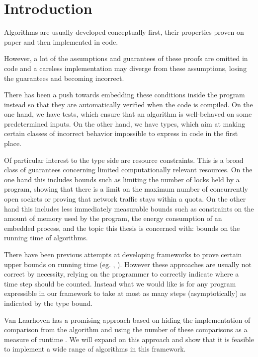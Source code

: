 
\chapter{Introduction}
Algorithms are usually developed conceptually first, their properties proven on paper and then implemented in code.

However, a lot of the assumptions and guarantees of these proofs are omitted in code and a careless implementation may diverge from these assumptions, losing the guarantees and becoming incorrect.

There has been a push towards embedding these conditions inside the program instead so that they are automatically verified when the code is compiled. On the one hand, we have tests, which ensure that an algorithm is well-behaved on some predetermined inputs. On the other hand, we have types, which aim at making certain classes of incorrect behavior impossible to express in code in the first place.

Of particular interest to the type side are resource constraints. This is a broad class of guarantees concerning limited computationally relevant resources. On the one hand this includes bounds such as limiting the number of locks held by a program, showing that there is a limit on the maximum number of concurrently open sockets or proving that network traffic stays within a quota. On the other hand this includes less immediately measurable bounds such as constraints on the amount of memory used by the program, the energy consumption of an embedded process, and the topic this thesis is concerned with: bounds on the running time of algorithms.

There have been previous attempts at developing frameworks to prove certain upper bounds on running time (eg. \cite{danielsson:2008:time-complexity-analysis}, \cite{nipkow:2017:verified-root-balanced-trees}). However these approaches are usually not correct by necessity, relying on the programmer to correctly indicate where a time step should be counted. Instead what we would like is for any program expressible in our framework to take at most as many steps (asymptotically) as indicated by the type bound.

Van Laarhoven has a promising approach based on hiding the implementation of comparison from the algorithm and using the number of these comparisons as a measure of runtime \cite{laarhoven:2013:correctness-sorting}. We will expand on this approach and show that it is feasible to implement a wide range of algorithms in this framework.